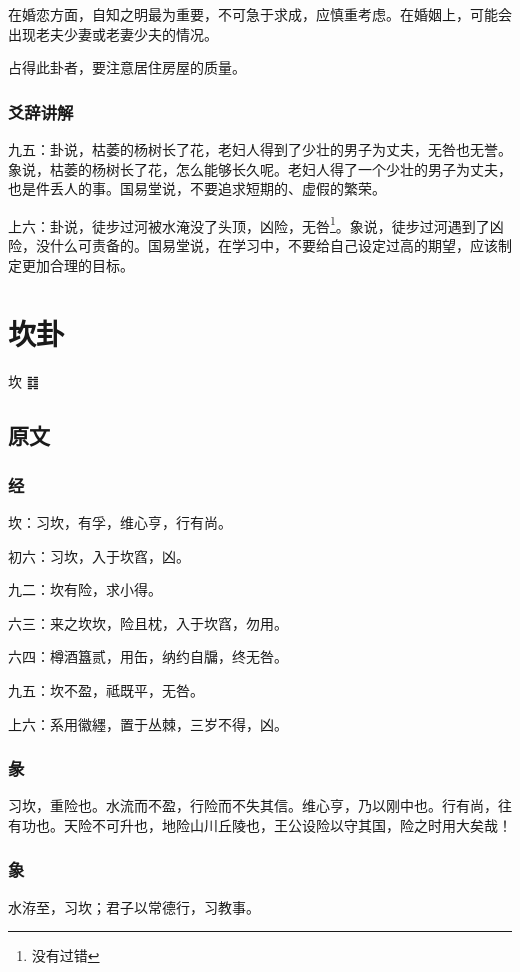 \documentclass[12pt,oneside]{book}
\begin{document}
在婚恋方面，自知之明最为重要，不可急于求成，应慎重考虑。在婚姻上，可能会出现老夫少妻或老妻少夫的情况。

占得此卦者，要注意居住房屋的质量。

\subsection{爻辞讲解}
九五：卦说，枯萎的杨树长了花，老妇人得到了少壮的男子为丈夫，无咎也无誉。象说，枯萎的杨树长了花，怎么能够长久呢。老妇人得了一个少壮的男子为丈夫，也是件丢人的事。国易堂说，不要追求短期的、虚假的繁荣。

上六：卦说，徒步过河被水淹没了头顶，凶险，无咎\footnote{没有过错}。象说，徒步过河遇到了凶险，没什么可责备的。国易堂说，在学习中，不要给自己设定过高的期望，应该制定更加合理的目标。

\chapter{坎卦}
坎 {\Large ䷜}

\section{原文}

\subsection{经}
坎：习坎，有孚，维心亨，行有尚。

初六：习坎，入于坎窞，凶。

九二：坎有险，求小得。

六三：来之坎坎，险且枕，入于坎窞，勿用。

六四：樽酒簋贰，用缶，纳约自牖，终无咎。

九五：坎不盈，祗既平，无咎。

上六：系用徽纆，置于丛棘，三岁不得，凶。

\subsection{彖}
习坎，重险也。水流而不盈，行险而不失其信。维心亨，乃以刚中也。行有尚，往有功也。天险不可升也，地险山川丘陵也，王公设险以守其国，险之时用大矣哉！

\subsection{象}
水洊至，习坎；君子以常德行，习教事。
\end{document}

